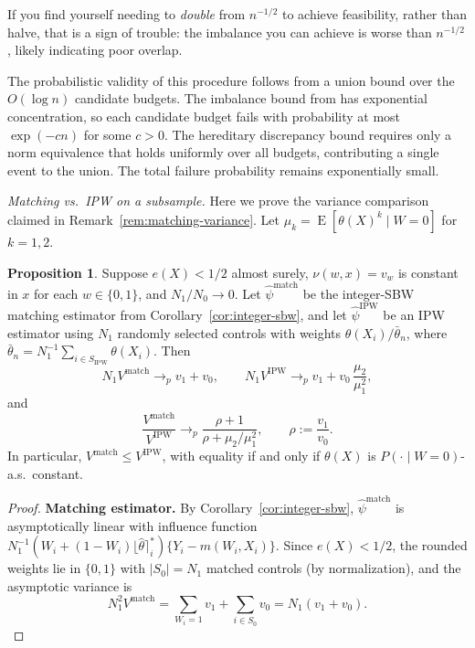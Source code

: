 \documentclass{article}
\newcommand{\paragraph}[1]{\par\noindent\textit{#1}\enspace}
\theoremstyle{definition}
\newtheorem{proposition}[theorem]{Proposition}
\DeclareMathOperator{\E}{E}
\newcommand{\<}{\langle}
\renewcommand{\>}{\rangle}
\begin{document}
\begin{refsection}
If you find yourself needing to \emph{double} from $n^{-1/2}$ to achieve feasibility, rather than halve, that is a sign of trouble: the imbalance you can achieve is worse than $n^{-1/2}$, likely indicating poor overlap.

The probabilistic validity of this procedure follows from a union bound over the $O(\log n)$ candidate budgets. The imbalance bound from \citet{hirshberg2019minimax} has exponential concentration, so each candidate budget fails with probability at most $\exp(-cn)$ for some $c > 0$. The hereditary discrepancy bound requires only a norm equivalence that holds uniformly over all budgets, contributing a single event to the union. The total failure probability remains exponentially small.

\paragraph{Matching vs.\ IPW on a subsample.}
Here we prove the variance comparison claimed in Remark~\ref{rem:matching-variance}. Let $\mu_k = \E[\theta(X)^k \mid W=0]$ for $k=1,2$.

\begin{proposition}
\label{prop:matching-efficiency}
Suppose $e(X) < 1/2$ almost surely, $\nu(w,x) = v_w$ is constant in $x$ for each $w\in\{0,1\}$, and $N_1/N_0 \to 0$. Let $\hat\psi^{\mathrm{match}}$ be the integer-SBW matching estimator from Corollary~\ref{cor:integer-sbw}, and let $\hat\psi^{\mathrm{IPW}}$ be an IPW estimator using $N_1$ randomly selected controls with weights $\theta(X_i)/\bar\theta_n$, where $\bar\theta_n = N_1^{-1}\sum_{i \in S_{\mathrm{IPW}}}\theta(X_i)$. Then
\[
N_1 V^{\mathrm{match}} \to_p v_1 + v_0, \qquad N_1 V^{\mathrm{IPW}} \to_p v_1 + v_0\,\frac{\mu_2}{\mu_1^2},
\]
and
\[
\frac{V^{\mathrm{match}}}{V^{\mathrm{IPW}}} \to_p \frac{\rho + 1}{\rho + \mu_2/\mu_1^2}, \qquad \rho := \frac{v_1}{v_0}.
\]
In particular, $V^{\mathrm{match}} \le V^{\mathrm{IPW}}$, with equality if and only if $\theta(X)$ is $P(\cdot\mid W=0)$-a.s.\ constant.
\end{proposition}

\begin{proof}
\textbf{Matching estimator.}
By Corollary~\ref{cor:integer-sbw}, $\hat\psi^{\mathrm{match}}$ is asymptotically linear with influence function $N_1^{-1}(W_i + (1-W_i)\lfloor\hat\theta\rceil^*_i)\{Y_i - m(W_i,X_i)\}$. Since $e(X)<1/2$, the rounded weights lie in $\{0,1\}$ with $|S_0| = N_1$ matched controls (by normalization), and the asymptotic variance is
\[
N_1^2 V^{\mathrm{match}} = \sum_{W_i=1} v_1 + \sum_{i\in S_0} v_0 = N_1(v_1 + v_0).
\]


\end{proof}
\end{refsection}
\end{document}
